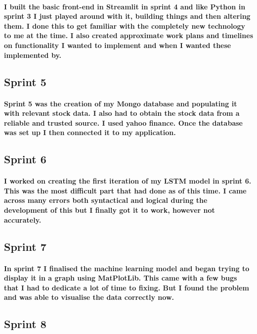 \paragraph{I built the basic front-end in Streamlit in sprint 4 and like Python in sprint 3 I just played around with it, building things and then altering them. I done this to get familiar with the completely new technology to me at the time. I also created approximate work plans and timelines on functionality I wanted to implement and when I wanted these implemented by.}

\subsection{Sprint 5}
\paragraph{Sprint 5 was the creation of my Mongo database and populating it with relevant stock data. I also had to obtain the stock data from a reliable and trusted source. I used yahoo finance. Once the database was set up I then connected it to my application.}

\subsection{Sprint 6}
\paragraph{I worked on creating the first iteration of my LSTM model in sprint 6. This was the most difficult part that had done as of this time. I came across many errors both syntactical and logical during the development of this but I finally got it to work, however not accurately.}

\subsection{Sprint 7}
\paragraph{In sprint 7 I finalised the machine learning model and began trying to display it in a graph using MatPlotLib. This came with a few bugs that I had to dedicate a lot of time to fixing. But I found the problem and was able to visualise the data correctly now.}

\subsection{Sprint 8}
